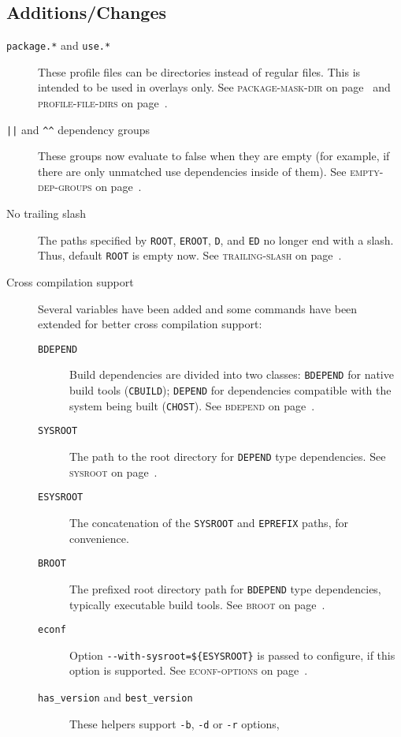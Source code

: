 \documentclass[a4paper,nofoldmark]{leaflet}
\newcommand{\code}[1]{\texttt{#1}}
\newcommand{\featureref}[1]{\textsc{#1} on page~\pageref{feat:#1}}
\begin{document}
\subsection{Additions/Changes}
\label{sec:cs:eapi7-additions}
\begin{description}
    \item[\code{package.*} and \code{use.*}] These profile files can
    be directories instead of regular files. This is intended to be
    used in overlays only.
    See \featureref{package-mask-dir} and \featureref{profile-file-dirs}.
    \item[\code{||} and \code{\textasciicircum\textasciicircum}
    dependency groups] These groups now evaluate to false when they
    are empty (for example, if there are only unmatched use
    dependencies inside of them).
    See \featureref{empty-dep-groups}.
    \item[No trailing slash] The paths specified by \code{ROOT},
    \code{EROOT}, \code{D}, and \code{ED} no longer end with a slash.
    Thus, default \code{ROOT} is empty now.
    See \featureref{trailing-slash}.
    \item[Cross compilation support] Several variables have been added
    and some commands have been extended for better cross compilation
    support:
    \begin{description}
        \item[\code{BDEPEND}] Build dependencies are divided into two
        classes: \code{BDEPEND} for native build tools (\code{CBUILD});
        \code{DEPEND} for dependencies compatible with the system
        being built (\code{CHOST}).
        See \featureref{bdepend}.
        \item[\code{SYSROOT}] The path to the root directory for
        \code{DEPEND} type dependencies.
        See \featureref{sysroot}.
        \item[\code{ESYSROOT}] The concatenation of the \code{SYSROOT}
        and \code{EPREFIX} paths, for convenience.
        \item[\code{BROOT}] The prefixed root directory path for
        \code{BDEPEND} type dependencies, typically executable build
        tools.
        See \featureref{broot}.
        \item[\code{econf}]
        Option \code{-{}-with-sysroot=\$\{ESYSROOT\}} is passed to
        configure, if this option is supported.
        See \featureref{econf-options}.
        \item[\code{has_version} and \code{best_version}] These
        helpers support \code{-b}, \code{-d} or \code{-r} options,

\end{description}
\end{description}
\end{document}
